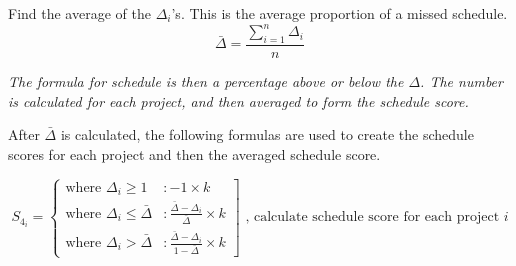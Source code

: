 \documentclass[SDSUThesis.tex]{subfiles}
\begin{document}
                Find the average of the $\Delta_i$'s.  This is the average proportion of a missed
                schedule.  
                \begin{displaymath}
                   \bar{\Delta}  = \frac{\sum^n_{i=1}\Delta_i}{n}
                \end{displaymath}
                
                \textit{The formula for schedule is then a percentage above or below the $\Delta$.  
                The number is calculated for each project, and then averaged to form the schedule score.}
                
                After $\bar{\Delta}$ is calculated, the following formulas are used to create the schedule scores
                for each project and then the averaged schedule score.
            
                \begin{displaymath}
                   S_{4_i} = \left\{
                     \begin{array}{lr}
                        \text{where } \Delta_i \geq 1 & : -1 \times k \\
                       \text{where }  \Delta_i \leq \bar{\Delta} & : \frac{\bar{\Delta} - \Delta_i}{\bar{\Delta}}   \times k  \\
                       \text{where } \Delta_i > \bar{\Delta} & : \frac{\bar{\Delta} - \Delta_i}{1 - \bar{\Delta}} \times k
                     \end{array}
                   \right] \text{   , calculate schedule score for each project $i$}
                \end{displaymath} 
        
\end{document}
